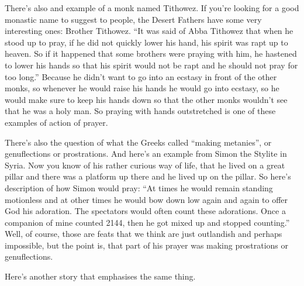 There's also and example of a monk named Tithowez. If you're looking for a good monastic name to suggest to people, the Desert Fathers have some very interesting ones: Brother Tithowez. ``It was said of Abba Tithowez that when he stood up to pray, if he did not quickly lower his hand, his spirit was rapt up to heaven. So if it happened that some brothers were praying with him, he hastened to lower his hands so that his spirit would not be rapt and he should not pray for too long.'' Because he didn't want to go into an ecstasy in front of the other monks, so whenever he would raise his hands he would go into ecstasy, so he would make sure to keep his hands down so that  the other monks wouldn't see that he was a holy man. So praying with hands outstretched is one of these examples of action of prayer.

There's also the question of what the Greeks called ``making metanies'', or genuflections or prostrations. And here's an example from Simon the Stylite in Syria. Now you know of his rather curious way of life, that he lived on a great pillar and there was a platform up there and he lived up on the pillar. So here's description of how Simon would pray: ``At times he would remain standing motionless and at other times he would bow down low again and again to offer God his adoration. The spectators would often count these adorations. Once a companion of mine counted 2144, then he got mixed up and stopped counting.'' Well, of course, those are feats that we think are just outlandish and perhaps impossible, but the point is, that part of his prayer was making prostrations or genuflections.

Here's another story that emphasises the same thing.














